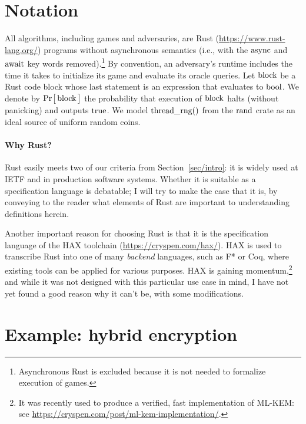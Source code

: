 \documentclass{article}
\newcommand{\Prob}[1]{\Pr\hspace{-1pt}\big[\,#1\,\big]}
\newcommand{\code}[1]{\textrm{\textup{\lstinline{#1}}}}
\begin{document}
\section{Notation}\label{sec/notation}

All algorithms, including games and adversaries, are Rust
(\url{https://www.rust-lang.org/}) programs without asynchronous semantics
(i.e., with the $\code{async}$ and $\code{await}$ key words
removed).\footnote{Asynchronous Rust is excluded because it is not needed to
formalize execution of games.}
%
By convention, an adversary's runtime includes the time it takes to initialize
its game and evaluate its oracle queries.
%
Let $\code{block}$ be a Rust code block whose last statement is an expression
that evaluates to $\code{bool}$.
%
We denote by $\Prob{\code{block}}$ the probability that execution of
$\code{block}$ halts (without panicking) and outputs $\code{true}$.
%
We model
\href{https://rust-random.github.io/rand/rand/fn.thread_rng.html}{$\code{thread_rng()}$}
from the
\href{https://rust-random.github.io/rand/rand/index.html}{$\code{rand}$} crate
as an ideal source of uniform random coins.

\paragraph{Why Rust?}
%
Rust easily meets two of our criteria from Section~\ref{sec/intro}: it is
widely used at IETF and in production software systems.
%
Whether it is suitable as a specification language is debatable; I will try to
make the case that it is, by conveying to the reader what elements of Rust are
important to understanding definitions herein.

Another important reason for choosing Rust is that it is the specification
language of the HAX toolchain (\url{https://cryspen.com/hax/}).
%
HAX is used to transcribe Rust into one of many \emph{backend} languages, such
as F* or Coq, where existing tools can be applied for various purposes.
%
HAX is gaining momentum,\footnote{It was recently used to produce a verified,
fast implementation of ML-KEM: see
\url{https://cryspen.com/post/ml-kem-implementation/}.} and while it was not
designed with this particular use case in mind, I have not yet found a good
reason why it can't be, with some modifications.


\section{Example: hybrid encryption}\label{sec/hybrid}
\end{document}
